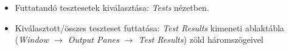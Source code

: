 \begin{frame}
  \begin{itemize}
    \item Futtatandó tesztesetek kiválasztása: \emph{Tests} nézetben.\\
  \end{itemize}
\end{frame}

\begin{frame}
  \begin{itemize}
    \item Kiválasztott/összes teszteset futtatása: \emph{Test Results} kimeneti ablaktábla (\emph{Window $\to$ Output Panes 
$\to$ Test Results}) zöld háromszögeivel\\
  \end{itemize}
\end{frame}

